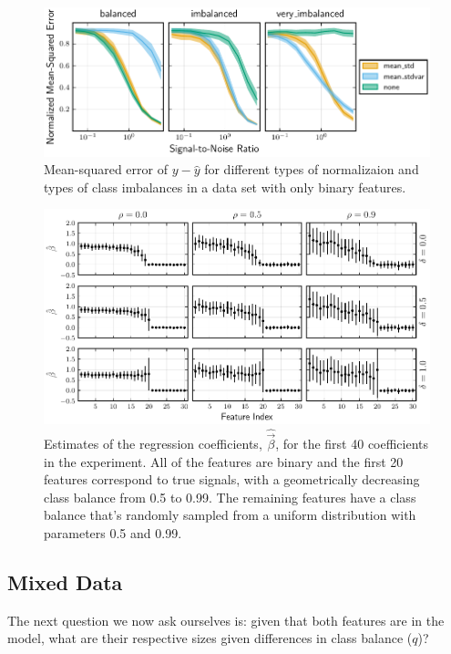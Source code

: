\begin{figure}[htpb]
  \centering
  \includegraphics[]{plots/binary_data_sim.pdf}
  \caption{%
    Mean-squared error of \(y - \hat y\) for different types of normalizaion and types of class imbalances in a data set with only binary features.
  }
  \label{fig:binary-sim}
\end{figure}

\begin{figure}[htpb]
  \centering
  \includegraphics[]{plots/binary_decreasing.pdf}
  \caption{%
    Estimates of the regression coefficients, \(\hat{\vec{\beta}}\), for the first 40 coefficients in the experiment. All of the features are binary and the first 20 features correspond to true signals, with a geometrically decreasing class balance from 0.5 to 0.99. The remaining features have a class balance that's randomly sampled from a uniform distribution with parameters 0.5 and 0.99.}
  \label{fig:binary-decreasing}
\end{figure}

\subsection{Mixed Data}

The next question we now ask ourselves is: given that both features are in the model, what are their respective sizes given differences in class balance (\(q\))?

